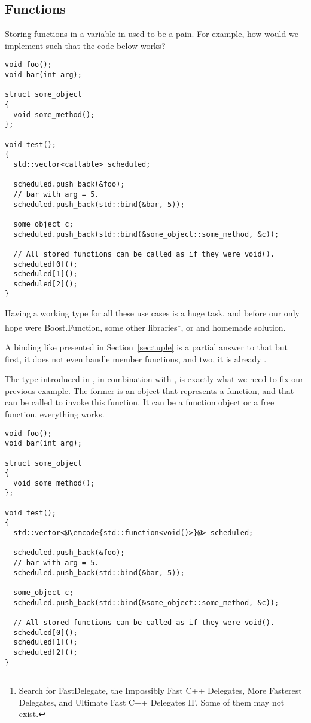 \subsection{Functions}

\problemtitle

Storing functions in a variable in \cpp{} used to be a pain. For
example, how would we implement  such that the code
below works?

\begin{lstlisting}
void foo();
void bar(int arg);

struct some_object
{
  void some_method();
};

void test();
{
  std::vector<callable> scheduled;

  scheduled.push_back(&foo);
  // bar with arg = 5.
  scheduled.push_back(std::bind(&bar, 5));

  some_object c;
  scheduled.push_back(std::bind(&some_object::some_method, &c));

  // All stored functions can be called as if they were void().
  scheduled[0]();
  scheduled[1]();
  scheduled[2]();
}
\end{lstlisting}

Having a working type for all these use cases is a huge task, and
before  our only hope were Boost.Function, some other
libraries\footnote{Search for FastDelegate, the Impossibly Fast C++
  Delegates, More Fasterest Delegates, and Ultimate Fast C++ Delegates
  II'. Some of them may not exist.}, or and homemade solution.

A binding like presented in Section~\ref{sec:tuple} is a partial
answer to that but first, it does not even handle member functions,
and two, it is already .

\solutiontitle

%
%
The  type introduced in , in combination
with  , is exactly what we
need to fix our previous example. The former is an object that represents a
function, and that can be called to invoke this function. It can be a
function object or a free function, everything works.

\begin{lstlisting}
void foo();
void bar(int arg);

struct some_object
{
  void some_method();
};

void test();
{
  std::vector<@\emcode{std::function<void()>}@> scheduled;

  scheduled.push_back(&foo);
  // bar with arg = 5.
  scheduled.push_back(std::bind(&bar, 5));

  some_object c;
  scheduled.push_back(std::bind(&some_object::some_method, &c));

  // All stored functions can be called as if they were void().
  scheduled[0]();
  scheduled[1]();
  scheduled[2]();
}
\end{lstlisting}


